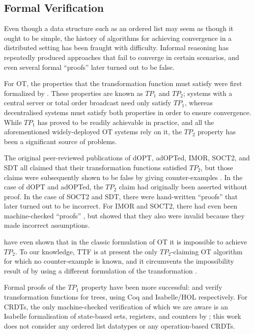 \subsection{Formal Verification}\label{sect.related.verification}

Even though a data structure such as an ordered list may seem as though it ought to be simple, the
history of algorithms for achieving convergence in a distributed setting has been fraught with
difficulty. Informal reasoning has repeatedly produced approaches that fail to converge in certain
scenarios, and even several formal ``proofs'' later turned out to be false.

For OT, the properties that the transformation function must satisfy were first formalized by
\citet{Ressel:1996wx}. These properties are known as $\mathit{TP}_1$ and $\mathit{TP}_2$; systems
with a central server or total order broadcast need only satisfy $\mathit{TP}_1$, whereas
decentralised systems must satisfy both properties in order to ensure convergence. While
$\mathit{TP}_1$ has proved to be readily achievable in practice, and all the aforementioned
widely-deployed OT systems rely on it, the $\mathit{TP}_2$ property has been a significant source of
problems.

The original peer-reviewed publications of dOPT, adOPTed, IMOR, SOCT2, and SDT all claimed that
their transformation functions satisfied $\mathit{TP}_2$, but those claims were subsequently shown
to be false by giving counter-examples \cite{Imine:2003ks,Imine:2006kn,Oster:2005vi}. In the case of
dOPT and adOPTed, the $\mathit{TP}_2$ claim had originally been asserted without proof. In the case
of SOCT2 and SDT, there were hand-written ``proofs'' that later turned out to be incorrect. For IMOR
and SOCT2, there had even been machine-checked ``proofs'' \cite{Imine:2003ks}, but
\citet{Oster:2005vi} showed that they also were invalid because they made incorrect assumptions.

\citet{Randolph:2015gj} have even shown that in the classic formulation of OT it is impossible to
achieve $\mathit{TP}_2$. To our knowledge, TTF is at present the only $\mathit{TP}_2$-claiming OT
algorithm for which no counter-example is known, and it circumvents the impossibility result of
\citet{Randolph:2015gj} by using a different formulation of the transformation
\cite{Oster:2006tr,Levien:2016wz}.

Formal proofs of the $\mathit{TP}_1$ property have been more successful: \citet{Sinchuk:2016cf} and
\citet{Jungnickel:2015ua} verify transformation functions for trees, using Coq and Isabelle/HOL
respectively. For CRDTs, the only machine-checked verification of which we are aware is an Isabelle
formalisation of state-based sets, registers, and counters by \citet{Zeller:2014fl}; this work does
not consider any ordered list datatypes or any operation-based CRDTs.

